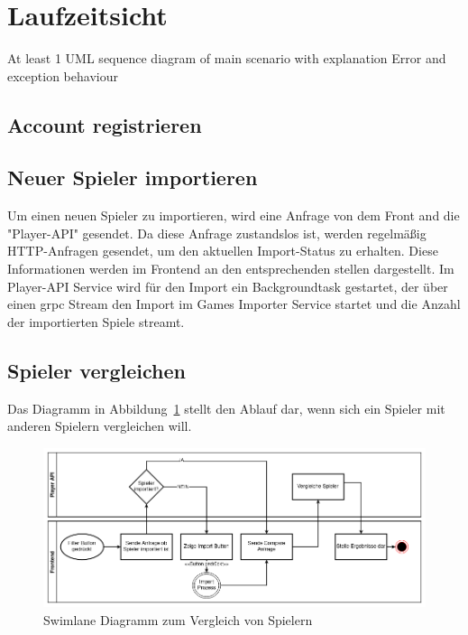 \section{Laufzeitsicht}
At least 1 UML sequence diagram of main scenario with explanation
Error and exception behaviour
\subsection{Account registrieren}

\subsection{Neuer Spieler importieren}

Um einen neuen Spieler zu importieren, wird eine Anfrage von dem Front and die "Player-API" gesendet.
Da diese Anfrage zustandslos ist, werden regelmäßig HTTP-Anfragen gesendet, um den aktuellen Import-Status
zu erhalten.
Diese Informationen werden im Frontend an den entsprechenden stellen dargestellt.
Im Player-API Service wird für den Import ein Backgroundtask gestartet, der über einen grpc Stream den Import im
Games Importer Service startet und die Anzahl der importierten Spiele streamt.


\subsection{Spieler vergleichen}

Das Diagramm in Abbildung~\ref{fig:compare-diagram} stellt den Ablauf dar, wenn sich ein Spieler mit anderen Spielern vergleichen will.
\begin{figure}
    \centering
    \includegraphics[width=\textwidth]{images/cdc-07-compare.drawio}
    \caption{Swimlane Diagramm zum Vergleich von Spielern}
    \label{fig:compare-diagram}
\end{figure}


